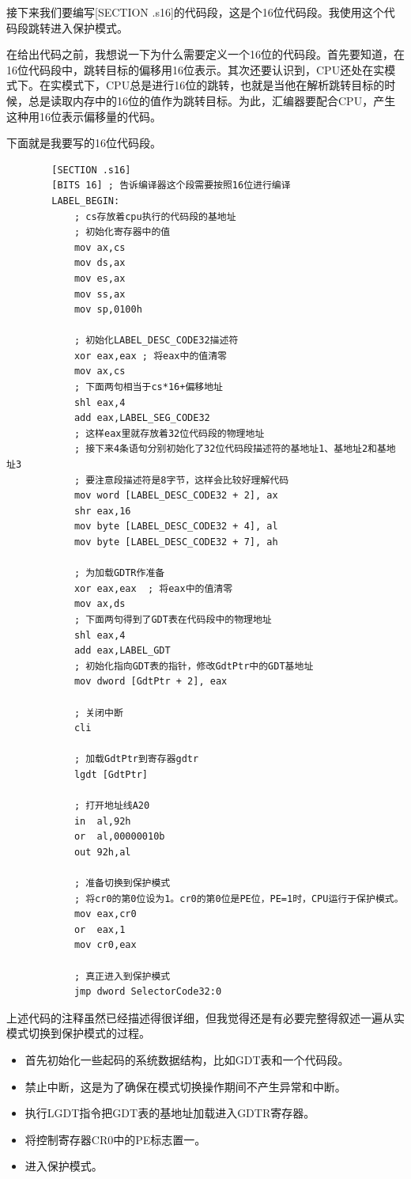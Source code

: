 \documentclass[a4paper,left=2.5cm,right=2.5cm,11pt]{article}
\begin{document}
	接下来我们要编写[SECTION .s16]的代码段，这是个16位代码段。我使用这个代码段跳转进入保护模式。\par
	在给出代码之前，我想说一下为什么需要定义一个16位的代码段。首先要知道，在16位代码段中，跳转目标的偏移用16位表示。其次还要认识到，CPU还处在实模式下。在实模式下，CPU总是进行16位的跳转，也就是当他在解析跳转目标的时候，总是读取内存中的16位的值作为跳转目标。为此，汇编器要配合CPU，产生这种用16位表示偏移量的代码。\par
	下面就是我要写的16位代码段。
	\begin{lstlisting}
		[SECTION .s16]
		[BITS 16] ; 告诉编译器这个段需要按照16位进行编译
		LABEL_BEGIN:
			; cs存放着cpu执行的代码段的基地址
			; 初始化寄存器中的值
		    mov ax,cs
		    mov ds,ax
		    mov es,ax
		    mov ss,ax
		    mov sp,0100h
			
			; 初始化LABEL_DESC_CODE32描述符
		    xor eax,eax ; 将eax中的值清零
		    mov ax,cs
			; 下面两句相当于cs*16+偏移地址
		    shl eax,4
		    add eax,LABEL_SEG_CODE32
			; 这样eax里就存放着32位代码段的物理地址
			; 接下来4条语句分别初始化了32位代码段描述符的基地址1、基地址2和基地址3
			; 要注意段描述符是8字节，这样会比较好理解代码
		    mov word [LABEL_DESC_CODE32 + 2], ax
		    shr eax,16
		    mov byte [LABEL_DESC_CODE32 + 4], al
		    mov byte [LABEL_DESC_CODE32 + 7], ah
			
			; 为加载GDTR作准备
		    xor eax,eax  ; 将eax中的值清零
		    mov ax,ds
			; 下面两句得到了GDT表在代码段中的物理地址
		    shl eax,4
		    add eax,LABEL_GDT
			; 初始化指向GDT表的指针，修改GdtPtr中的GDT基地址
		    mov dword [GdtPtr + 2], eax
			
			; 关闭中断
		    cli
			
			; 加载GdtPtr到寄存器gdtr
		    lgdt [GdtPtr]
			
			; 打开地址线A20
		    in  al,92h
		    or  al,00000010b
		    out 92h,al
			
			; 准备切换到保护模式
			; 将cr0的第0位设为1。cr0的第0位是PE位，PE=1时，CPU运行于保护模式。
		    mov eax,cr0
		    or  eax,1
		    mov cr0,eax
			
			; 真正进入到保护模式
		    jmp dword SelectorCode32:0
	\end{lstlisting}
	
	上述代码的注释虽然已经描述得很详细，但我觉得还是有必要完整得叙述一遍从实模式切换到保护模式的过程。
	\begin{itemize}
		\item 首先初始化一些起码的系统数据结构，比如GDT表和一个代码段。
		\item 禁止中断，这是为了确保在模式切换操作期间不产生异常和中断。
		\item 执行LGDT指令把GDT表的基地址加载进入GDTR寄存器。
		\item 将控制寄存器CR0中的PE标志置一。
		\item 进入保护模式。
	\end{itemize}
	
\end{document}
